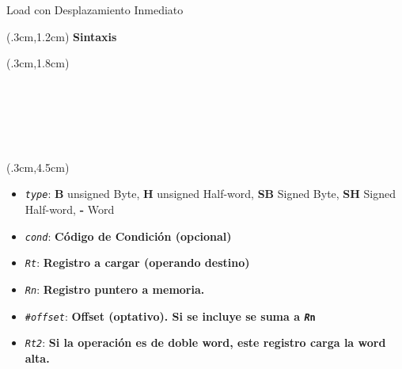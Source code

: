 \documentclass[usenames,table,dvipsnames,aspectratio=169]{beamer}
\begin{document}
\begin{frame}[fragile]{Load con Desplazamiento Inmediato}
 \begin{textblock*}{\textwidth}(.3cm,1.2cm)
  \textbf{Sintaxis}
 \end{textblock*}
 \footnotesize
\begin{textblock*}{\textwidth}(.3cm,1.8cm)
\ttfamily \obeyspaces
{}\\
\\
\\
\\
\\
\\
\end{textblock*}
 \begin{textblock*}{\textwidth}(.3cm,4.5cm)
  \begin{itemize}
   \item<7-> [] \textit{\texttt{type}}: \textbf{B} unsigned Byte, \textbf{H} unsigned Half-word, \textbf{SB} Signed Byte, \textbf{SH} Signed Half-word, \textbf{-} Word
   \item<8-> [] \texttt{\textit{cond}}:     \textbf{Código de Condición (opcional)}
   \item<9-> [] \texttt{\textit{Rt}}:       \textbf{Registro a cargar (operando destino)}
   \item<10-> [] \textit{\texttt{Rn}}:       \textbf{Registro puntero a memoria.}
   \item<11-> [] \textit{\texttt{\#offset}}: \textbf{Offset (optativo). Si se incluye se suma a \texttt{\textit{R}n}}
   \item<12-> [] \texttt{\textit{Rt2}}:      \textbf{Si la operación es de doble word, este registro carga la word alta.}
  \end{itemize}
 \end{textblock*}
\end{frame}
\end{document}
